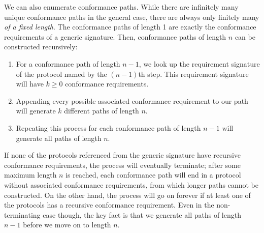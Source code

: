 \documentclass[a4paper,headsepline,bibliography=totoc,toc=flat,fleqn,twoside=semi]{scrbook}
\theoremstyle{definition}
\theoremstyle{definition}
\theoremstyle{definition}
\begin{document}
We can also enumerate conformance paths. While there are infinitely many unique conformance paths in the general case, there are always only finitely many \emph{of a fixed length}. The conformance paths of length 1 are exactly the conformance requirements of a generic signature. Then, conformance paths of length $n$ can be constructed recursively:
\begin{enumerate}
\item For a conformance path of length $n-1$, we look up the requirement signature of the protocol named by the $(n-1)$th step. This requirement signature will have $k\ge 0$ conformance requirements.
\item Appending every possible associated conformance requirement to our path will generate $k$ different paths of length $n$.
\item Repeating this process for each conformance path of length $n-1$ will generate all paths of length $n$.
\end{enumerate}
If none of the protocols referenced from the generic signature have recursive conformance requirements, the process will eventually terminate; after some maximum length $n$ is reached, each conformance path will end in a protocol without associated conformance requirements, from which longer paths cannot be constructed. On the other hand, the process will go on forever if at least one of the protocols has a recursive conformance requirement. Even in the non-terminating case though, the key fact is that we generate all paths of length $n-1$ before we move on to length $n$.
\end{document}

